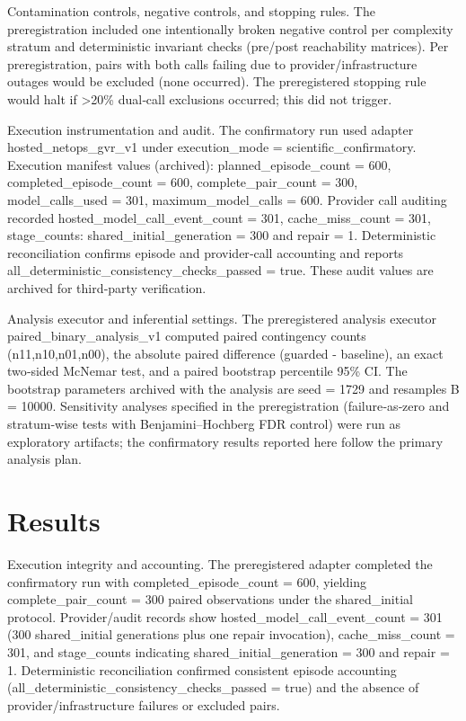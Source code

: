 \documentclass[conference]{IEEEtran}
\begin{document}
Contamination controls, negative controls, and stopping rules. The preregistration included one intentionally broken negative control per complexity stratum and deterministic invariant checks (pre/post reachability matrices). Per preregistration, pairs with both calls failing due to provider/infrastructure outages would be excluded (none occurred). The preregistered stopping rule would halt if >20\% dual‑call exclusions occurred; this did not trigger.

Execution instrumentation and audit. The confirmatory run used adapter hosted\_netops\_gvr\_v1 under execution\_mode = scientific\_confirmatory. Execution manifest values (archived): planned\_episode\_count = 600, completed\_episode\_count = 600, complete\_pair\_count = 300, model\_calls\_used = 301, maximum\_model\_calls = 600. Provider call auditing recorded hosted\_model\_call\_event\_count = 301, cache\_miss\_count = 301, stage\_counts: shared\_initial\_generation = 300 and repair = 1. Deterministic reconciliation confirms episode and provider‑call accounting and reports all\_deterministic\_consistency\_checks\_passed = true. These audit values are archived for third‑party verification.

Analysis executor and inferential settings. The preregistered analysis executor paired\_binary\_analysis\_v1 computed paired contingency counts (n11,n10,n01,n00), the absolute paired difference (guarded - baseline), an exact two‑sided McNemar test, and a paired bootstrap percentile 95\% CI. The bootstrap parameters archived with the analysis are seed = 1729 and resamples B = 10000. Sensitivity analyses specified in the preregistration (failure‑as‑zero and stratum‑wise tests with Benjamini--Hochberg FDR control) were run as exploratory artifacts; the confirmatory results reported here follow the primary analysis plan.

\section{Results}
Execution integrity and accounting. The preregistered adapter completed the confirmatory run with completed\_episode\_count = 600, yielding complete\_pair\_count = 300 paired observations under the shared\_initial protocol. Provider/audit records show hosted\_model\_call\_event\_count = 301 (300 shared\_initial generations plus one repair invocation), cache\_miss\_count = 301, and stage\_counts indicating shared\_initial\_generation = 300 and repair = 1. Deterministic reconciliation confirmed consistent episode accounting (all\_deterministic\_consistency\_checks\_passed = true) and the absence of provider/infrastructure failures or excluded pairs.
\end{document}

